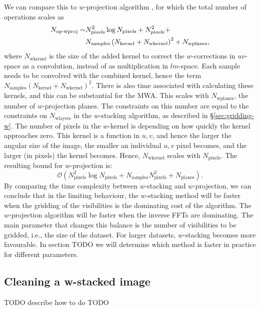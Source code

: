 \documentclass[useAMS,usenatbib]{mn2e}
\begin{document}
We can compare this to $w$-projection algorithm \citep{wprojection-cornwell}, for which the total number of operations scales as
\begin{align} \notag
 N_\textrm{op-wproj} \sim & N^2_\textrm{pixels} \log N_\textrm{pixels} + N^2_\textrm{pixels} + \\
 & N_\textrm{samples} \left( N_\textrm{kernel} + N_\textrm{wkernel} \right)^2 + N_\textrm{wplanes},
\end{align}
where $N_\textrm{wkernel}$ is the size of the added kernel to correct the $w$-corrections in $uv$-space as a convolution, instead of as multiplication in $lm$-space. Each sample needs to be convolved with the combined kernel, hence the term $N_\textrm{samples} \left( N_\textrm{kernel} + N_\textrm{wkernel} \right)^2$. There is also time associated with calculating these kernels, and this can be substantial for the MWA. This scales with $N_\textrm{wplanes}$, the number of $w$-projection planes. The constraints on this number are equal to the constraints on $N_\textrm{wlayers}$ in the $w$-stacking algorithm, as described in \S\ref{sec:gridding-w}. The number of pixels in the $w$-kernel is depending on how quickly the kernel approaches zero. This kernel is a function in $u,v$, and hence the larger the angular size of the image, the smaller an individual $u,v$ pixel becomes, and the larger (in pixels) the kernel becomes. Hence, $N_\textrm{wkernel}$ scales with $N_\textrm{pixels}$. The resulting bound for $w$-projection is:
\begin{equation}
\mathcal{O}\left(N^2_\textrm{pixels} \log N_\textrm{pixels} + N_\textrm{samples} N^2_\textrm{pixels} + N_\textrm{planes} \right).
\end{equation}
By comparing the time complexity between $w$-stacking and $w$-projection, we can conclude that in the limiting behaviour, the $w$-stacking method will be faster when the gridding of the visibilities is the dominating cost of the algorithm. The $w$-projection algorithm will be faster when the inverse FFTs are dominating. The main parameter that changes this balance is the number of visibilities to be gridded, i.e., the size of the dataset. For larger datasets, $w$-stacking becomes more favourable. In section TODO we will determine which method is faster in practice for different parameters.

\subsection{Cleaning a w-stacked image}
TODO describe how to do
TODO \citet{hogbom-clean}
\end{document}

